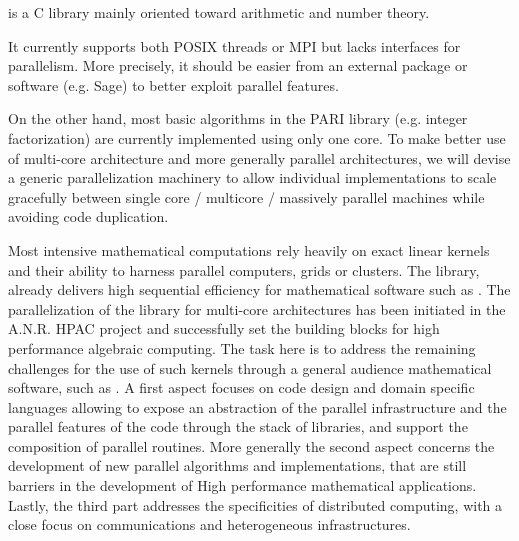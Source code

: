 \begin{workpackage}[id=hpc,wphases=0-48,
  title=High Performance Computing,
  PSRM=1, %
  LLRM=12, %
  SARM=18, %
  UKRM=1, %
  UBRM=1, %
  UJFRM=12]
\begin{wpdescription}
\end{wpdescription}
\begin{tasklist}
\begin{task}[title=PARI,id=hpc-pari]
  \Pari is a C library mainly oriented toward arithmetic and number theory.
  
  It currently supports both POSIX threads or MPI but lacks interfaces for
  parallelism. More precisely, it should be easier from an external package
  or software (e.g. Sage) to better exploit \Pari parallel features.

  On the other hand, most basic algorithms in the PARI library (e.g. integer
  factorization) are currently implemented using only one core. To
  make better use of multi-core architecture and more generally parallel
  architectures, we will devise a generic parallelization machinery
  to allow individual implementations to scale gracefully between single
  core / multicore / massively parallel machines while avoiding code
  duplication.
\end{task}

\begin{task}[title=GAP,id=hpc-gap]

\end{task}

\begin{task}[title=Linbox,id=hpc-linbox]
Most intensive mathematical computations rely heavily on exact linear kernels
and their ability to harness parallel computers, grids or clusters. The \Linbox
library, already delivers high sequential efficiency for mathematical software
such as \Sage. The parallelization of the library for multi-core architectures
has been initiated in the A.N.R. HPAC project and successfully set the building
blocks for high performance algebraic computing. 
The task here is to  address the remaining challenges for the use of such
kernels through a general audience mathematical software, such as \Sage.
A first aspect focuses on code design and domain specific languages allowing to
expose an abstraction of the parallel infrastructure and the parallel features
of the code through the stack of libraries, and support the
composition of parallel routines.  More generally the second aspect concerns the
development of new parallel algorithms and implementations, that are still
barriers in the development of High performance mathematical
applications. Lastly, the third part addresses the specificities of  distributed
computing, with a close focus on communications and heterogeneous infrastructures.


\end{task}
\end{tasklist}
\end{workpackage}
